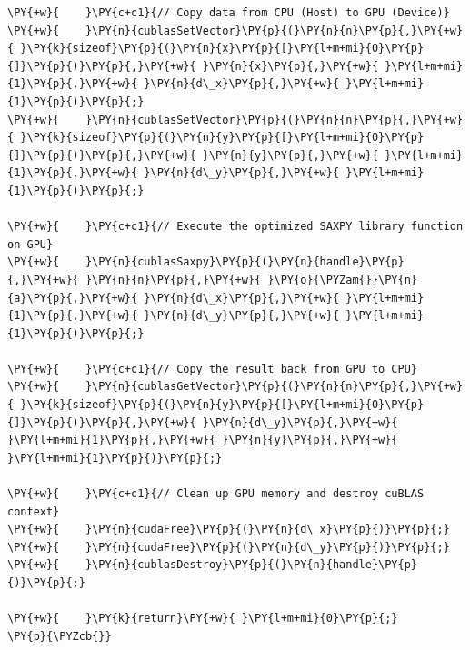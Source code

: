 \begin{Verbatim}[label=\makebox{\url{https://github.com/lucabaldini/cmepda/tree/master/slides/latex/snippets/cublas_saxpy.cpp}},commandchars=\\\{\}]
\PY{+w}{    }\PY{c+c1}{// Copy data from CPU (Host) to GPU (Device)}
\PY{+w}{    }\PY{n}{cublasSetVector}\PY{p}{(}\PY{n}{n}\PY{p}{,}\PY{+w}{ }\PY{k}{sizeof}\PY{p}{(}\PY{n}{x}\PY{p}{[}\PY{l+m+mi}{0}\PY{p}{]}\PY{p}{)}\PY{p}{,}\PY{+w}{ }\PY{n}{x}\PY{p}{,}\PY{+w}{ }\PY{l+m+mi}{1}\PY{p}{,}\PY{+w}{ }\PY{n}{d\_x}\PY{p}{,}\PY{+w}{ }\PY{l+m+mi}{1}\PY{p}{)}\PY{p}{;}
\PY{+w}{    }\PY{n}{cublasSetVector}\PY{p}{(}\PY{n}{n}\PY{p}{,}\PY{+w}{ }\PY{k}{sizeof}\PY{p}{(}\PY{n}{y}\PY{p}{[}\PY{l+m+mi}{0}\PY{p}{]}\PY{p}{)}\PY{p}{,}\PY{+w}{ }\PY{n}{y}\PY{p}{,}\PY{+w}{ }\PY{l+m+mi}{1}\PY{p}{,}\PY{+w}{ }\PY{n}{d\_y}\PY{p}{,}\PY{+w}{ }\PY{l+m+mi}{1}\PY{p}{)}\PY{p}{;}

\PY{+w}{    }\PY{c+c1}{// Execute the optimized SAXPY library function on GPU}
\PY{+w}{    }\PY{n}{cublasSaxpy}\PY{p}{(}\PY{n}{handle}\PY{p}{,}\PY{+w}{ }\PY{n}{n}\PY{p}{,}\PY{+w}{ }\PY{o}{\PYZam{}}\PY{n}{a}\PY{p}{,}\PY{+w}{ }\PY{n}{d\_x}\PY{p}{,}\PY{+w}{ }\PY{l+m+mi}{1}\PY{p}{,}\PY{+w}{ }\PY{n}{d\_y}\PY{p}{,}\PY{+w}{ }\PY{l+m+mi}{1}\PY{p}{)}\PY{p}{;}

\PY{+w}{    }\PY{c+c1}{// Copy the result back from GPU to CPU}
\PY{+w}{    }\PY{n}{cublasGetVector}\PY{p}{(}\PY{n}{n}\PY{p}{,}\PY{+w}{ }\PY{k}{sizeof}\PY{p}{(}\PY{n}{y}\PY{p}{[}\PY{l+m+mi}{0}\PY{p}{]}\PY{p}{)}\PY{p}{,}\PY{+w}{ }\PY{n}{d\_y}\PY{p}{,}\PY{+w}{ }\PY{l+m+mi}{1}\PY{p}{,}\PY{+w}{ }\PY{n}{y}\PY{p}{,}\PY{+w}{ }\PY{l+m+mi}{1}\PY{p}{)}\PY{p}{;}

\PY{+w}{    }\PY{c+c1}{// Clean up GPU memory and destroy cuBLAS context}
\PY{+w}{    }\PY{n}{cudaFree}\PY{p}{(}\PY{n}{d\_x}\PY{p}{)}\PY{p}{;}
\PY{+w}{    }\PY{n}{cudaFree}\PY{p}{(}\PY{n}{d\_y}\PY{p}{)}\PY{p}{;}
\PY{+w}{    }\PY{n}{cublasDestroy}\PY{p}{(}\PY{n}{handle}\PY{p}{)}\PY{p}{;}

\PY{+w}{    }\PY{k}{return}\PY{+w}{ }\PY{l+m+mi}{0}\PY{p}{;}
\PY{p}{\PYZcb{}}
\end{Verbatim}